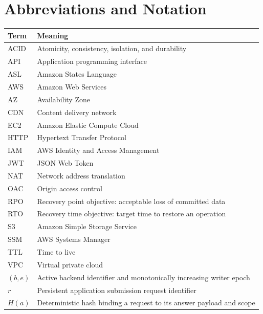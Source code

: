 \documentclass[12pt,a4paper,oneside]{report}
\begin{document}
\chapter*{Abbreviations and Notation}
\begin{tabularx}{\textwidth}{@{}L{29mm}Y@{}}\toprule
\textbf{Term} & \textbf{Meaning}\\\midrule
ACID & Atomicity, consistency, isolation, and durability\\
API & Application programming interface\\
ASL & Amazon States Language\\
AWS & Amazon Web Services\\
AZ & Availability Zone\\
CDN & Content delivery network\\
EC2 & Amazon Elastic Compute Cloud\\
HTTP & Hypertext Transfer Protocol\\
IAM & AWS Identity and Access Management\\
JWT & JSON Web Token\\
NAT & Network address translation\\
OAC & Origin access control\\
RPO & Recovery point objective: acceptable loss of committed data\\
RTO & Recovery time objective: target time to restore an operation\\
S3 & Amazon Simple Storage Service\\
SSM & AWS Systems Manager\\
TTL & Time to live\\
VPC & Virtual private cloud\\
$(b,e)$ & Active backend identifier and monotonically increasing writer epoch\\
$r$ & Persistent application submission request identifier\\
$H(a)$ & Deterministic hash binding a request to its answer payload and scope\\\bottomrule
\end{tabularx}\clearpage
{}









\appendix
\end{document}
